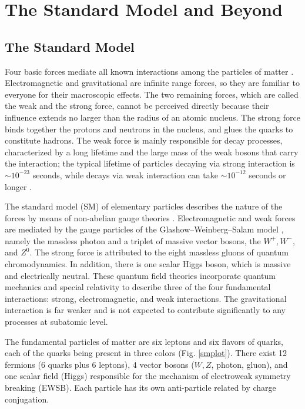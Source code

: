 \chapter{The Standard Model and Beyond}

\section{The Standard Model}

Four basic forces mediate all known interactions among the particles of matter \cite{t_hooft_gauge_1980}. Electromagnetic and gravitational are infinite range forces, so they are familiar to everyone for their macroscopic effects. The two remaining forces, which are called the weak and the strong force, cannot be perceived directly because their influence extends no larger than the radius of an atomic nucleus. The strong force binds together the protons and neutrons in the nucleus, and glues the quarks to constitute hadrons. The weak force is mainly responsible for decay processes, characterized by a long lifetime and the large mass of the weak bosons that carry the interaction; the typical lifetime of particles decaying via strong interaction is $\sim 10^{-23}$ seconds, while decays via weak interaction can take $\sim 10^{-12}$ seconds or longer \cite{Halzen:1984mc}.

The standard model (SM) \cite{Novaes:1999yn} of elementary particles describes the nature of the forces by means of non-abelian gauge theories \cite{Quigg:2013ufa}. Electromagnetic and weak forces are mediated by the gauge particles of the Glashow--Weinberg--Salam model \cite{Glashow:1961tr}, namely the massless photon and a triplet of massive vector bosons, the $W^+,W^{-}$, and $Z^0$. The strong force is attributed to the eight massless gluons of quantum chromodynamics. In addition, there is one scalar Higgs boson, which is massive and electrically neutral. These quantum field theories incorporate quantum mechanics and special relativity to describe three of the four fundamental interactions: strong, electromagnetic, and weak interactions. The gravitational interaction is far weaker and is not expected to contribute significantly to any processes at subatomic level.

The fundamental particles  of matter are six leptons and six flavors of quarks, each of the quarks being present in three colors (Fig. \ref{smplot}). There exist 12 fermions (6 quarks plus 6 leptons), 4 vector bosons ($W, Z$, photon, gluon), and one scalar field (Higgs) responsible for the mechanism of electroweak symmetry breaking (EWSB). Each particle has its own anti-particle related by charge conjugation. 

